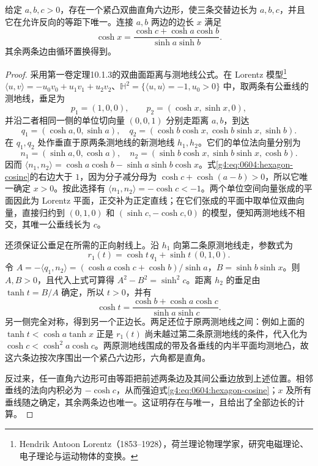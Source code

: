 \begin{lemma}
	\label{g4:lem:0604:right-hexagon}
	给定 \(a,b,c>0\)，存在一个紧凸双曲直角六边形，使三条交替边长为 \(a,b,c\)，并且它在允许反向的等距下唯一。连接 \(a,b\) 两边的边长 \(x\) 满足
	\begin{equation}
		\label{g4:eq:0604:hexagon-cosine}
		\cosh x=\frac{\cosh c+\cosh a\cosh b}{\sinh a\sinh b}.
	\end{equation}
	其余两条边由循环置换得到。
\end{lemma}
\begin{proof}
	采用第一卷定理10.1.3的双曲面距离与测地线公式。在 Lorentz 模型\footnote{Hendrik Antoon Lorentz（1853--1928），荷兰理论物理学家，研究电磁理论、电子理论与运动物体的变换。} \(\langle u,v\rangle=-u_0v_0+u_1v_1+u_2v_2\)、\(\mathbb H^2=\{\langle u,u\rangle=-1,u_0>0\}\) 中，取两条有公垂线的测地线，垂足为
	\[
		p_1=(1,0,0),\qquad p_2=(\cosh x,\sinh x,0),
	\]
	并沿二者相同一侧的单位切向量 \((0,0,1)\) 分别走距离 \(a,b\)，到达
	\[
		q_1=(\cosh a,0,\sinh a),\quad
		q_2=(\cosh b\cosh x,\cosh b\sinh x,\sinh b).
	\]
	在 \(q_1,q_2\) 处作垂直于原两条测地线的新测地线 \(h_1,h_2\)。它们的单位法向量分别为
	\[
		n_1=(\sinh a,0,\cosh a),\quad
		n_2=(\sinh b\cosh x,\sinh b\sinh x,\cosh b).
	\]
	因而 \(\langle n_1,n_2\rangle=\cosh a\cosh b-\sinh a\sinh b\cosh x\)。式\eqref{g4:eq:0604:hexagon-cosine}的右边大于 \(1\)，因为分子减分母为 \(\cosh c+\cosh(a-b)>0\)，所以它唯一确定 \(x>0\)。按此选择有 \(\langle n_1,n_2\rangle=-\cosh c<-1\)。两个单位空间向量张成的平面因此为 Lorentz 平面，正交补为正定直线；在它们张成的平面中取单位双曲向量，直接归约到 \((0,1,0)\) 和 \((\sinh c,-\cosh c,0)\) 的模型，便知两测地线不相交，其唯一公垂线长为 \(c\)。

	还须保证公垂足在所需的正向射线上。沿 \(h_1\) 向第二条原测地线走，参数式为
	\[
		r_1(t)=\cosh t\,q_1+\sinh t\,(0,1,0).
	\]
	令 \(A=-\langle q_1,n_2\rangle=(\cosh a\cosh c+\cosh b)/\sinh a\)，\(B=\sinh b\sinh x\)。则 \(A,B>0\)，且代入上式可算得 \(A^2-B^2=\sinh^2c\)。距离 \(h_2\) 的垂足由 \(\tanh t=B/A\) 确定，所以 \(t>0\)，并有
	\[
		\cosh t=\frac{\cosh b+\cosh a\cosh c}{\sinh a\sinh c}.
	\]
	另一侧完全对称，得到另一个正边长。两足还位于原两测地线之间：例如上面的 \(\tanh t<\cosh a\tanh x\) 正是 \(r_1(t)\) 尚未越过第二条原测地线的条件，代入化为 \(\cosh c<\cosh^2a\cosh c\)。两原测地线围成的带及各垂线的内半平面均测地凸，故这六条边按次序围出一个紧凸六边形，六角都是直角。

	反过来，任一直角六边形可由等距把前述两条边及其间公垂边放到上述位置。相邻垂线的法向内积必为 \(-\cosh c\)，从而强迫式\eqref{g4:eq:0604:hexagon-cosine}；\(x\) 及所有垂线随之确定，其余两条边也唯一。这证明存在与唯一，且给出了全部边长的计算。
\end{proof}

